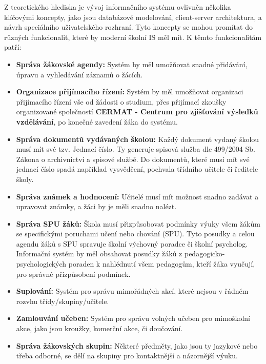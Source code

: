 \documentclass[FM,Proj]{tulthesis}
\begin{document}
Z teoretického hlediska je vývoj informačního systému ovlivněn několika klíčovými
koncepty, jako jsou databázové modelování, client-server architektura, a návrh speciálního
uživatelského rozhraní. Tyto koncepty se mohou promítat do různých funkcionalit, 
které by moderní školní IS měl mít. K těmto funkcionalitám patří:

\begin{itemize}
    \item \textbf{Správa žákovské agendy:} Systém by měl umožňovat snadné přidávání, úpravu a vyhledávání záznamů o žácích.
    
    \item \textbf{Organizace přijímacího řízení:} Systém by měl umožňovat organizaci přijímacího řízení vše od 
    žádosti o studium, přes přijímací zkoušky organizované společností \textbf{CERMAT - Centrum pro zjišťování 
    výsledků vzdělávání}, po konečné zavedení žáka do systému.
    
    \item \textbf{Správa dokumentů vydávaných školou:} Každý dokument vydaný školou musí mít své tzv. Jednací číslo.
    Ty generuje spisová služba dle 499/2004 Sb. Zákona o archivnictví a spisové službě. Do dokumentů, které musí mít
    své jednací číslo spadá například vysvědčení, pochvala třídního učitele či ředitele školy.

    \item \textbf{Správa známek a hodnocení:} Učitelé musí mít možnost snadno zadávat a upravovat známky, 
    a žáci by je měli snadno nalézt.

    \item \textbf{Správa SPU žáků:} Škola musí přizpůsobovat podmínky výuky všem žákům se specifickými poruchami učení
    nebo chování (SPU). Tyto posudky a celou agendu žáků s SPU spravuje školní výchovný poradce či školní psycholog.
    Informační systém by měl obsahovat posudky žáků z pedagogicko-psychologických poraden k nahlédnutí všem pedagogům, 
    kteří žáka vyučují, pro správné přizpůsobení podmínek.

    \item \textbf{Suplování:} Systém pro správu mimořádných akcí, které nejsou v řádném rozvhu třídy/skupiny/učitele.
    
    \item \textbf{Zamlouvání učeben:} Systém pro správu volných učeben pro mimoškolní akce, jako jsou kroužky, komerční
    akce, či doučování.
    
    \item \textbf{Správa žákovských skupin:} Některé předměty, jako jsou ty jazykové nebo třeba odborné, se dělí na skupiny pro 
    kontaktnější a názornější výuku.
    

\end{itemize}
\end{document}
